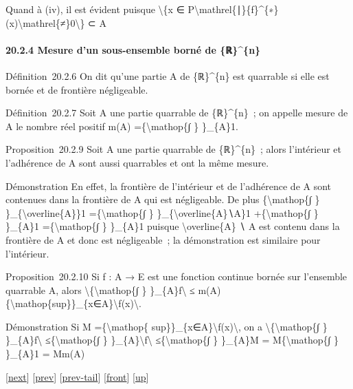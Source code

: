 \documentclass[]{article}
\begin{document}
Quand à (iv), il est évident puisque \textbackslash{}\{x ∈
P\textbackslash{}mathrel\{∣\}\{f\}\^{}\{∗\}(x)\textbackslash{}mathrel\{≠\}0\textbackslash{}\}
⊂ A

\paragraph{20.2.4 Mesure d'un sous-ensemble borné de \{ℝ\}\^{}\{n\}}

Définition~20.2.6 On dit qu'une partie A de \{ℝ\}\^{}\{n\} est quarrable
si elle est bornée et de frontière négligeable.

Définition~20.2.7 Soit A une partie quarrable de \{ℝ\}\^{}\{n\}~; on
appelle mesure de A le nombre réel positif m(A)
=\{\textbackslash{}mathop\{∫ \} \}\_\{A\}1.

Proposition~20.2.9 Soit A une partie quarrable de \{ℝ\}\^{}\{n\}~; alors
l'intérieur et l'adhérence de A sont aussi quarrables et ont la même
mesure.

Démonstration En effet, la frontière de l'intérieur et de l'adhérence de
A sont contenues dans la frontière de A qui est négligeable. De plus
\{\textbackslash{}mathop\{∫ \} \}\_\{\textbackslash{}overline\{A\}\}1
=\{\textbackslash{}mathop\{∫ \} \}\_\{\textbackslash{}overline\{A\}∖A\}1
+\{\textbackslash{}mathop\{∫ \} \}\_\{A\}1 =\{\textbackslash{}mathop\{∫
\} \}\_\{A\}1 puisque \textbackslash{}overline\{A\} ∖ A est contenu dans
la frontière de A et donc est négligeable~; la démonstration est
similaire pour l'intérieur.

Proposition~20.2.10 Si f : A → E est une fonction continue bornée sur
l'ensemble quarrable A, alors
\textbackslash{}\textbar{}\{\textbackslash{}mathop\{∫ \}
\}\_\{A\}f\textbackslash{}\textbar{} ≤
m(A)\{\textbackslash{}mathop\{sup\}\}\_\{x∈A\}\textbackslash{}\textbar{}f(x)\textbackslash{}\textbar{}.

Démonstration Si M =\{\textbackslash{}mathop\{
sup\}\}\_\{x∈A\}\textbackslash{}\textbar{}f(x)\textbackslash{}\textbar{},
on a \textbackslash{}\textbar{}\{\textbackslash{}mathop\{∫ \}
\}\_\{A\}f\textbackslash{}\textbar{} ≤\{\textbackslash{}mathop\{∫ \}
\}\_\{A\}\textbackslash{}\textbar{}f\textbackslash{}\textbar{}
≤\{\textbackslash{}mathop\{∫ \} \}\_\{A\}M =
M\{\textbackslash{}mathop\{∫ \} \}\_\{A\}1 = Mm(A)

{[}\href{coursse106.html}{next}{]} {[}\href{coursse104.html}{prev}{]}
{[}\href{coursse104.html\#tailcoursse104.html}{prev-tail}{]}
{[}\href{coursse105.html}{front}{]}
{[}\href{coursch21.html\#coursse105.html}{up}{]}
\end{document}

